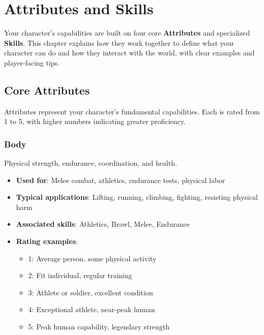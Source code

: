 \chapter{Attributes and Skills}
\label{ch:attributes-skills}

Your character's capabilities are built on four core \textbf{Attributes} and specialized \textbf{Skills}. This chapter explains how they work together to define what your character can do and how they interact with the world, with clear examples and player-facing tips.

\section{Core Attributes}

Attributes represent your character's fundamental capabilities. Each is rated from 1 to 5, with higher numbers indicating greater proficiency.

\subsection*{Body}

Physical strength, endurance, coordination, and health.
\begin{itemize}
\item \textbf{Used for}: Melee combat, athletics, endurance tests, physical labor
\item \textbf{Typical applications}: Lifting, running, climbing, fighting, resisting physical harm
\item \textbf{Associated skills}: Athletics, Brawl, Melee, Endurance
\item \textbf{Rating examples}:
  \begin{itemize}
    \item 1: Average person, some physical activity
    \item 2: Fit individual, regular training
    \item 3: Athlete or soldier, excellent condition
    \item 4: Exceptional athlete, near-peak human
    \item 5: Peak human capability, legendary strength
  \end{itemize}
\end{itemize}

